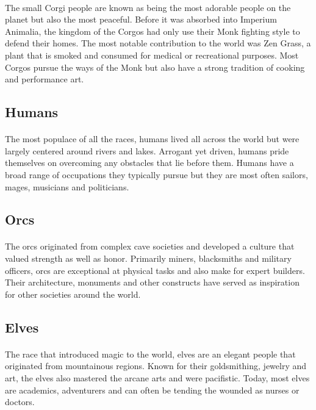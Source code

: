\paragraph{} The small Corgi people are known as being the most adorable people on the planet but also the most peaceful. Before it was absorbed into Imperium Animalia, the kingdom of the Corgos had only use their Monk fighting style to defend their homes. The most notable contribution to the world was Zen Grass, a plant that is smoked and consumed for medical or recreational purposes. Most Corgos pursue the ways of the Monk but also have a strong tradition of cooking and performance art.

\subsection{Humans}

\paragraph{} The most populace of all the races, humans lived all across the world but were largely centered around rivers and lakes. Arrogant yet driven, humans pride themselves on overcoming any obstacles that lie before them. Humans have a broad range of occupations they typically pursue but they are most often sailors, mages, musicians and politicians.

\subsection{Orcs}

\paragraph{} The orcs originated from complex cave societies and developed a culture that valued strength as well as honor. Primarily miners, blacksmiths and military officers, orcs are exceptional at physical tasks and also make for expert builders. Their architecture, monuments and other constructs have served as inspiration for other societies around the world.

\subsection{Elves}

\paragraph{} The race that introduced magic to the world, elves are an elegant people that originated from mountainous regions. Known for their goldsmithing, jewelry and art, the elves also mastered the arcane arts and were pacifistic. Today, most elves are academics, adventurers and can often be tending the wounded as nurses or doctors.

